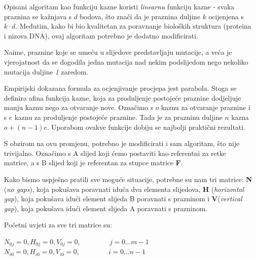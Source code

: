 \documentclass[times, utf8, zavrsni, numeric]{fer}
\begin{document}
Opisani algoritam kao funkciju kazne koristi \emph{linearnu} funkciju kazne - svaka praznina se kažnjava s $d$ bodova, što znači da je praznina duljine $k$ ocijenjena s $k\cdot d$. Međutim, kako bi bio kvalitetan za poravnanje bioloških struktura (proteina i nizova DNA), ovaj algoritam potrebno je dodatno modificirati.

Naime, praznine koje se umeću u slijedove predstavljaju mutacije, a veća je vjerojatnost da se dogodila jedna mutacija nad nekim podslijedom nego nekoliko mutacija duljine \emph{1} zaredom.

Empirijski dokazana formula za ocjenjivanje procjepa jest parabola. Stoga se definira afina funkcija kazne, koja za produljenje postojeće praznine dodjeljuje manju kaznu nego za otvaranje nove. Označimo s $o$ kaznu za otvaranje praznine i s $e$ kaznu za produljenje postojeće praznine. Tada je za prazninu duljine $n$ kazna  $o + (n - 1)e$. Uporabom ovakve funkcije dobiju se najbolji praktični rezultati.\cite{gapopen}

S obzirom na ovu promjenu, potrebno je modificirati i sam algoritam, što nije trivijalno. Označimo s A slijed koji ćemo postaviti kao referentni za retke matrice, a s B slijed koji je referentan za stupce matrice \textbf{F}.

Kako bismo uspješno pratili sve moguće situacije, potrebne su nam tri matrice: \textbf{N} (\emph{no gaps}), koja pokušava poravnati iduća dva elementa slijedova, \textbf{H} (\emph{horizontal gap}), koja pokušava idući element slijeda B poravnati s prazninom i \textbf{V}(\emph{vertical gap}), koja pokušava idući element slijeda A poravnati s prazninom.

Početni uvjeti za sve tri matrice su:
\begin{center}
$N_{0j} = 0, H_{0j} = 0, V_{0j} = 0,\hspace{50pt} j = 0...m-1$\\
$N_{i0} = 0, H_{i0} = 0, V_{i0} = 0,\hspace{50pt} i = 0...n-1$
\end{center}
\end{document}
